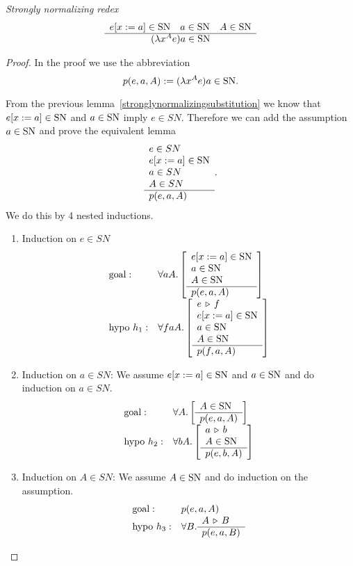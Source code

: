 \begin{lemma}
  \emph{Strongly normalizing redex}
  \label{stronglynormalizingredex}
  $$
  \begin{array}{c} e[x:=a] \in \text{SN} \quad a \in \text{SN} \quad A \in \text{SN} \\ \hline (\lambda x^A e)a \in \text{SN}\end{array}
  $$
  \begin{proof}
    In the proof we use the abbreviation
    $$ p(e,a,A) := (\lambda x^A e) a \in \text{SN}. $$

    From the previous lemma~\ref{stronglynormalizingsubstitution} we know that
    $e[x:=a] \in \text{SN}$ and $a \in \text{SN}$ imply $e \in SN$. Therefore we can add
    the assumption $a \in \text{SN}$ and prove the equivalent lemma
    $$
    \begin{array}{l} 
      e \in SN
      \\ e[x:=a] \in \text{SN}
      \\ a \in SN
      \\ A \in SN
       \\ \hline p(e,a,A)\end{array}.
    $$
    We do this by 4 nested inductions.
    \begin{enumerate}

    \item Induction on $e \in SN$
      $$
      \begin{array}{ll}
        \text{goal}:
        & \forall a A.
          \left[
          \rulev{
          e[x:=a] \in \SN
          \\ a \in \SN
          \\ A \in \SN
          }
        {p(e,a,A)}\right]
        \\
        \text{hypo }h_1:
        & \forall f a A.
          \left[
          \rulev{e \reduce f \\ e[x:=a] \in \SN \\ a \in \SN \\ A \in \SN}
        {p(f,a,A)}\right]

      \end{array}
      $$

    \item Induction on $a \in SN$:
      We assume $e[x:=a] \in \text{SN}$ and
      $a \in \text{SN}$ and do induction on $a \in SN$.
      $$
      \begin{array}{ll}
        \text{goal}:
        & \forall A. \left[\begin{array}{l} A \in \text{SN} \\ \hline p(e,a,A)\end{array}\right]
        \\
        \text{hypo }h_2:
        & \forall b A.
          \left[
          \begin{array}{l} a \,\triangleright\, b \\ A \in \text{SN} \\ \hline p(e,b,A)\end{array}
          \right]
      \end{array}
      $$

    \item Induction on $A \in SN$:
      We assume $A \in \text{SN}$ and do induction on the assumption.
      $$
      \begin{array}{ll}
        \text{goal}:
        &  p(e,a,A)
        \\
        \text{hypo }h_3:
        & \forall B. \begin{array}{l} A \,\triangleright\, B \\ \hline p(e,a,B)\end{array}
      \end{array}
      $$


\end{enumerate}
\end{proof}
\end{lemma}
